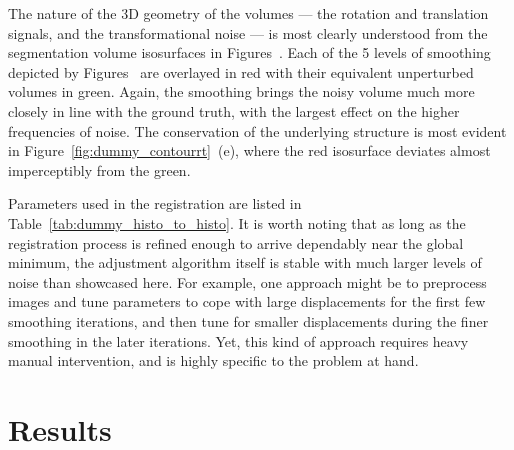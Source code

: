   The nature of the 3D geometry of the volumes --- the rotation and translation signals, and the transformational noise --- is most clearly understood from the segmentation volume isosurfaces in Figures~. Each of the 5 levels of smoothing depicted by Figures~ are overlayed in red with their equivalent unperturbed volumes in green. Again, the smoothing brings the noisy volume much more closely in line with the ground truth, with the largest effect on the higher frequencies of noise. The conservation of the underlying structure is most evident in Figure~\ref{fig:dummy_contourrt}~(e), where the red isosurface deviates almost imperceptibly from the green.
  
  Parameters used in the registration are listed in Table~\ref{tab:dummy_histo_to_histo}. It is worth noting that as long as the registration process is refined enough to arrive dependably near the global minimum, the adjustment algorithm itself is stable with much larger levels of noise than showcased here. For example, one approach might be to preprocess images and tune parameters to cope with large displacements for the first few smoothing iterations, and then tune for smaller displacements during the finer smoothing in the later iterations. Yet, this kind of approach requires heavy manual intervention, and is highly specific to the problem at hand.

\section{Results} %
\label{sec:results}
